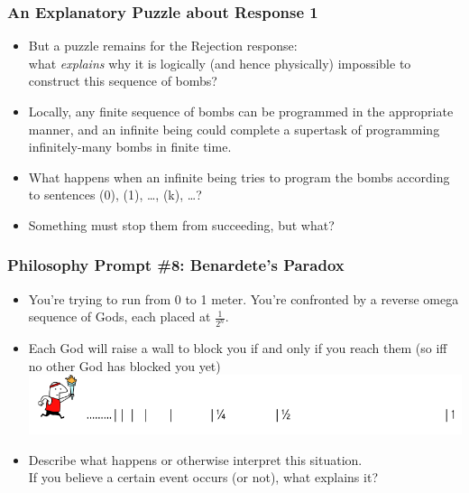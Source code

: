 \begin{frame}
\frametitle{An Explanatory Puzzle about Response 1}

\begin{itemize}[<+->]

\item But a puzzle remains for the Rejection response: \\ what \textit{explains} why it is logically (and hence physically) impossible to construct this sequence of bombs?

\item Locally, any finite sequence of bombs can be programmed in the appropriate manner, and an infinite being could complete a supertask of programming infinitely-many bombs in finite time. 


\item What happens when an infinite being tries to program the bombs according to sentences (0), (1), \dots, (k), \dots? 

\item Something must stop them from succeeding, but what?


\end{itemize}
\end{frame}

\begin{frame}
\frametitle{Philosophy Prompt \#8: Benardete's Paradox}

\begin{itemize}[<+->]
\item You're trying to run from 0 to 1 meter. You're confronted by a reverse omega sequence of Gods, each placed at $\frac{1}{2^n}$.
\item Each God will raise a wall to block you if and only if you reach them (so iff no other God has blocked you yet)\\[1ex]

\includegraphics[height=.22\textheight]{../assets/Benardete}

\item Describe what happens or otherwise interpret this situation. \\ If you believe a certain event occurs (or not), what explains it? 

\end{itemize}
\end{frame}

